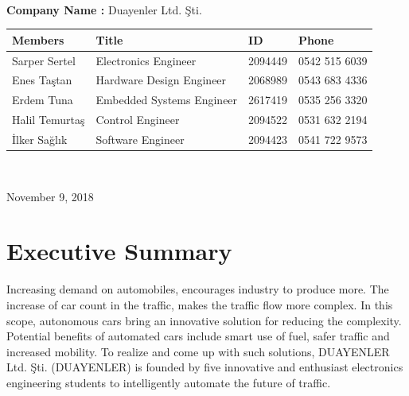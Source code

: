 \documentclass[a4paper,12pt]{article}
\begin{document}
\begin{titlepage}
\begin{minipage}[r]{0.35\textwidth}
\end{minipage}\\[1cm]
\begin{minipage}{\textwidth}
	\begin{flushleft}
		\large{\textbf{Company Name :}}	Duayenler Ltd. Şti.\\
		\begin{table}[H]
			\begin{tabular}{l l l l}
				\hline
				\textbf{Members}&\textbf{Title}& \textbf{ID}&\textbf{Phone} \\ \hline
				Sarper Sertel & Electronics Engineer& 2094449 & 0542 515 6039  \\ 
				Enes Taştan & Hardware Design Engineer & 2068989 & 0543 683 4336  \\ 
				Erdem Tuna & Embedded Systems Engineer& 2617419 & 0535 256 3320  \\ 
				Halil Temurtaş & Control Engineer& 2094522 & 0531 632 2194  \\
				İlker Sağlık & Software Engineer& 2094423 & 0541 722 9573  \\ \hline
				
				
			\end{tabular}
		\end{table}
	\end{flushleft}
\end{minipage}\\[1cm]

\begin{flushbottom}
{\large November 9, 2018} %
\end{flushbottom}

\end{titlepage}

\blankpage
\tableofcontents
\newpage



\section{Executive Summary}

	Increasing demand on automobiles, encourages industry to produce more. The increase of car count in the traffic, makes the traffic flow more complex. In this scope, autonomous cars bring an innovative solution for reducing the complexity. Potential benefits of automated cars include smart use of fuel, safer traffic and increased mobility. To realize and come up with such solutions, DUAYENLER Ltd. Şti. (DUAYENLER) is founded by five innovative and enthusiast electronics engineering students to intelligently automate the future of traffic.\\
	
\end{document}
